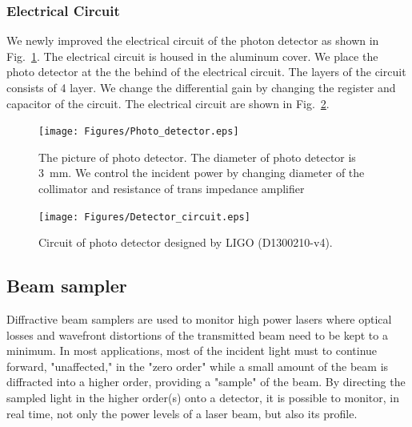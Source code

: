 \subsubsection{Electrical Circuit}
We newly improved the electrical circuit of the photon detector as shown in Fig.~\ref{fig:Photo_detector}. The electrical circuit is housed in the aluminum cover. We place the photo detector at the the behind of the electrical circuit. The layers of the circuit consists of 4 layer. We change the differential gain by changing the register and capacitor of the circuit. The electrical circuit are shown in Fig.~\ref{fig:Detector_circuit}.
\begin{figure}
\begin{center}
\texttt{[image: Figures/Photo\_detector.eps]}
\caption{The picture of photo detector. The diameter of photo detector is 3~mm. We control the incident power by changing diameter of the collimator and resistance of trans impedance amplifier} 
\label{fig:Photo_detector} 
\end{center}
\end{figure}
\begin{figure}
\begin{center}
\texttt{[image: Figures/Detector\_circuit.eps]}
\caption{Circuit of photo detector designed by LIGO (D1300210-v4).} 
\label{fig:Detector_circuit} 
\end{center}
\end{figure}

\subsection{Beam sampler}
Diffractive beam samplers are used to monitor high power lasers where optical losses and wavefront distortions of the transmitted beam need to be kept to a minimum.
In most applications, most of the incident light must to continue forward, "unaffected," in the "zero order" while a small amount of the beam is diffracted into a higher order, providing a "sample" of the beam.
By directing the sampled light in the higher order(s) onto a detector, it is possible to monitor, in real time, not only the power levels of a laser beam, but also its profile.

